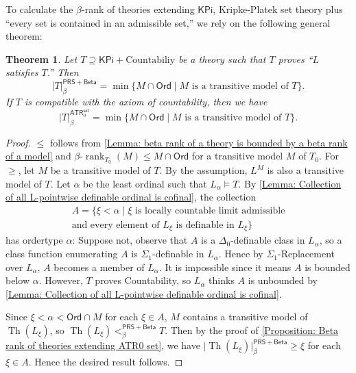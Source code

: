\documentclass{amsart}
\newtheorem{theorem}{Theorem}[section]
\theoremstyle{remark}
\newcommand{\PRS}{\mathsf{PRS}}
\newcommand{\Beta}{\mathsf{Beta}}
\newcommand{\ATR}{\mathsf{ATR}}
\newcommand{\KPi}{\mathsf{KPi}}
\newcommand{\set}{\mathsf{set}}
\newcommand{\Th}{\operatorname{Th}}
\newcommand{\betarank}{\beta\text{-}\operatorname{rank}}
\newcommand{\Ord}{\mathsf{Ord}}
\begin{document}
To calculate the $\beta$-rank of theories extending $\KPi$, Kripke-Platek set theory plus ``every set is contained in an admissible set,'' we rely on the following general theorem:
\begin{theorem}
    Let $T\supseteq \KPi + \text{Countabiliy}$ be a theory such that $T$ proves ``$L$ satisfies $T$.'' Then
    \begin{equation*}
        \lvert T\rvert^{\PRS+\Beta}_\beta = \min\{M\cap\Ord \mid \text{$M$ is a transitive model of $T$}\}.
    \end{equation*}
    If $T$ is compatible with the axiom of countability, then we have
    \begin{equation*}
        \lvert T\rvert^{\ATR_0^\set}_\beta = \min\{M\cap\Ord \mid \text{$M$ is a transitive model of $T$}\}.
    \end{equation*}
\end{theorem}
\begin{proof}
    $\le$ follows from \autoref{Lemma: beta rank of a theory is bounded by a beta rank of a model} and $\betarank_{T_0}(M)\le M\cap \Ord$ for a transitive model $M$ of $T_0$.
    For $\ge$, let $M$ be a transitive model of $T$. By the assumption, $L^M$ is also a transitive model of $T$.
    Let $\alpha$ be the least ordinal such that $L_\alpha \vDash T$. By \autoref{Lemma: Collection of all L-pointwise definable ordinal is cofinal}, the collection 
    \begin{multline*}
        A = \{\xi<\alpha \mid \text{$\xi$ is locally countable limit admissible} \\ \text{and every element of $L_\xi$ is definable in $L_\xi$}\}
    \end{multline*}
    has ordertype $\alpha$: Suppose not, observe that $A$ is a $\Delta_0$-definable class in $L_\alpha$, so a class function enumerating $A$ is $\Sigma_1$-definable in $L_\alpha$. Hence by $\Sigma_1$-Replacement over $L_\alpha$, $A$ becomes a member of $L_\alpha$. It is impossible since it means $A$ is bounded below $\alpha$. However, $T$ proves Countability, so $L_\alpha$ thinks $A$ is unbounded by \autoref{Lemma: Collection of all L-pointwise definable ordinal is cofinal}.

    Since $\xi<\alpha<\Ord\cap M$ for each $\xi\in A$, $M$ contains a transitive model of $\Th(L_\xi)$, so $\Th(L_\xi) <_\beta^{\PRS+\Beta} T$.
    Then by the proof of \autoref{Proposition: Beta rank of theories extending ATR0 set}, we have $\lvert\Th(L_\xi)\rvert^{\PRS+\Beta}_\beta\ge \xi$ for each $\xi\in A$. Hence the desired result follows.
\end{proof}
\end{document}
